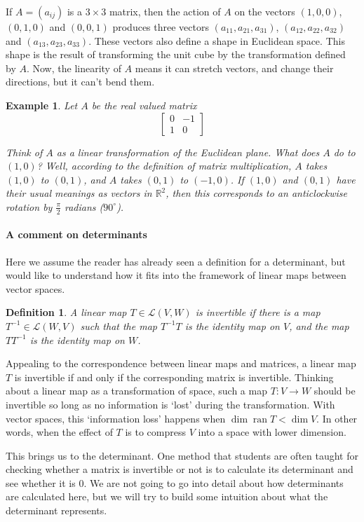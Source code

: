 \documentclass{article}
\theoremstyle{plain}
\newtheorem{definition}[theorem]{Definition}{\bfseries}{\upshape}
\newtheorem{example}[theorem]{Example}{\bfseries}{\upshape}
\newcommand{\bR}{\mathbb{R}}
\newcommand{\cL}{\mathcal{L}}
\DeclareMathOperator{\ran}{\mathrm{ran}}
\begin{document}
If $A=(a_{ij})$ is a $3\times 3$ matrix, then the action of $A$ on the vectors $(1,0,0)$, $(0,1,0)$ and $(0,0,1)$ produces three vectors $(a_{11}, a_{21}, a_{31})$, $(a_{12}, a_{22}, a_{32})$ and $(a_{13}, a_{23}, a_{33})$. These vectors also define a shape in Euclidean space. This shape is the result of transforming the unit cube by the transformation defined by $A$. Now, the linearity of $A$ means it can stretch vectors, and change their directions, but it can't bend them.

\begin{example}
Let $A$ be the real valued matrix
\[\begin{bmatrix}
0 & -1 \\
1 & 0
\end{bmatrix}\]

Think of $A$ as a linear transformation of the Euclidean plane. What does $A$ do to $(1,0)$? Well, according to the definition of matrix multiplication, $A$ takes $(1,0)$ to $(0,1)$, and $A$ takes $(0,1)$ to $(-1,0)$. If $(1,0)$ and $(0,1)$ have their usual meanings as vectors in $\bR^2$, then this corresponds to an anticlockwise rotation by $\frac{\pi}{2}$ radians ($90^\circ$).
\end{example}

\paragraph{A comment on determinants} 
Here we assume the reader has already seen a definition for a determinant, but would like to understand how it fits into the framework of linear maps between vector spaces. 

\begin{definition}
A linear map $T\in\cL(V,W)$ is \emph{invertible} if there is a map $T^{-1}\in\cL(W,V)$ such that the map $T^{-1}T$ is the identity map on $V$, and the map $TT^{-1}$ is the identity map on $W$.   
\end{definition}

Appealing to the correspondence between linear maps and matrices, a linear map $T$ is invertible if and only if the corresponding matrix is invertible. Thinking about a linear map as a transformation of space, such a map $T:V\to W$ should be invertible so long as no information is `lost' during the transformation. With vector spaces, this `information loss' happens when $\dim \ran T < \dim V$. In other words, when the effect of $T$ is to compress $V$ into a space with lower dimension. 

This brings us to the determinant. One method that students are often taught for checking whether a matrix is invertible or not is to calculate its determinant and see whether it is 0. We are not going to go into detail about how determinants are calculated here, but we will try to build some intuition about what the determinant represents. 
\end{document}
